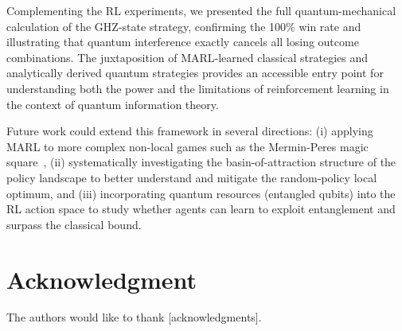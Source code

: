 \documentclass[conference]{IEEEtran}
\begin{document}
Complementing the RL experiments, we presented the full quantum-mechanical calculation of the GHZ-state strategy, confirming the 100\% win rate and illustrating that quantum interference exactly cancels all losing outcome combinations. The juxtaposition of MARL-learned classical strategies and analytically derived quantum strategies provides an accessible entry point for understanding both the power and the limitations of reinforcement learning in the context of quantum information theory.

Future work could extend this framework in several directions: (i) applying MARL to more complex non-local games such as the Mermin-Peres magic square~\cite{mermin1990simple,peres1990}, (ii) systematically investigating the basin-of-attraction structure of the policy landscape to better understand and mitigate the random-policy local optimum, and (iii) incorporating quantum resources (entangled qubits) into the RL action space to study whether agents can learn to exploit entanglement and surpass the classical bound.

\section*{Acknowledgment}

The authors would like to thank [acknowledgments].
\end{document}
